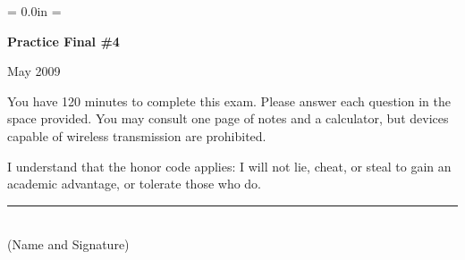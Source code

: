 \documentclass[letterpaper,12pt]{exam}
\def\HeadName{Practice Final \#1}
\begin{document}


\newpage
\def\HeadName{Practice Final \#4}
\parindent = 0.0in
\parskip = \bigskipamount
\setcounter{page}{1} \thispagestyle{empty}
\Head

\centerline{\large \bf \HeadName}%
\centerline{May 2009}

\bigskip
You have 120 minutes to complete this exam.  Please answer each
question in the space provided. You may consult one page of notes
and a calculator, but devices capable of wireless transmission are
prohibited.

I understand that the honor code applies: I will not lie, cheat,
or steal to gain an academic advantage, or tolerate those who do.

\begin{flushright}
\rule{4in}{0.5pt} \\ (Name and Signature)
\end{flushright}
\end{document}
